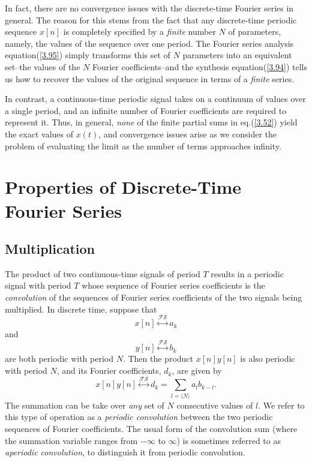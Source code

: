 \documentclass[a4paper,10pt,twoside]{book}
\begin{document}
In fact, there are no convergence issues with the discrete-time Fourier series in general. The reason for this stems from the fact that any discrete-time periodic sequence $x[n]$ is completely specified by a \textit{finite} number $N$ of parameters, namely, the values of the sequence over one period. The Fourier series analysis equation\;(\ref{3.95}) simply transforms this set of $N$ parameters into an equivalent set--the values of the $N$ Fourier coefficients--and the synthesis equation\;(\ref{3.94}) tells us how to recover the values of the original sequence in terms of a \textit{finite} series.

In contrast, a continuous-time periodic signal takes on a continuum of values over a single period, and an infinite number of Fourier coefficients are required to represent it. Thus, in general, \textit{none} of the finite partial sums in eq.\;(\ref{3.52}) yield the exact values of $x(t)$, and convergence issues arise as we consider the problem of evaluating the limit as the number of terms approaches infinity.

\section{Properties of Discrete-Time Fourier Series}
\subsection{Multiplication}
The product of two continuous-time signals of period $T$ results in a periodic signal with period $T$ whose sequence of Fourier series coefficients is the \textit{convolution} of the sequences of Fourier series coefficients of the two signals being multiplied. In discrete time, suppose that $$x[n]\overset{\mathcal{FS}}{\longleftrightarrow}a_k$$ and $$y[n]\overset{\mathcal{FS}}{\longleftrightarrow}b_k$$ are both periodic with period $N$. Then the product $x[n]y[n]$ is also periodic with period $N$, and its Fourier coefficients, $d_k$, are given by
\begin{equation}
    x[n]y[n]\overset{\mathcal{FS}}{\longleftrightarrow} d_k=\sum_{l=\langle N\rangle}a_lb_{k-l}.
    \label{3.108}
\end{equation}
The summation can be take over \textit{any} set of $N$ consecutive values of $l$. We refer to this type of operation as a \textit{periodic convolution} between the two periodic sequences of Fourier coefficients. The usual form of the convolution sum (where the summation variable ranges from $-\infty$ to $\infty$) is sometimes referred to as \textit{aperiodic convolution}, to distinguish it from periodic convolution.
\end{document}
